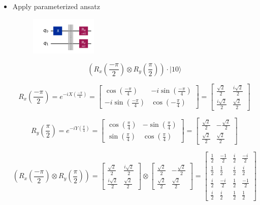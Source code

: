 \documentclass{article}
\begin{document}
\begin{itemize}
	\item Apply parameterized ansatz
	      \begin{figure}[H]
		      \centering
		      \includegraphics[width=0.3\textwidth, height=0.15\textheight]{ansatz1.png}
	      \end{figure}
	      \[
		      \left(R_x(\frac{-\pi}{2}) \otimes R_y(\frac{\pi}{2})\right) \cdot |10 \rangle
	      \]

	      \[
		      R_x(\frac{-\pi}{2}) = e^{-i X (\frac{-\pi}{4})} = \begin{bmatrix}
			      \cos(\frac{-\pi}{4})   & -i\sin(\frac{-\pi}{4}) \\
			      -i\sin(\frac{-\pi}{4}) & \cos(-\frac{\pi}{4})
		      \end{bmatrix}
		      =
		      \begin{bmatrix}
			      \frac{\sqrt{2}}{2}   & \frac{i \sqrt{2}}{2} \\
			      \frac{i \sqrt{2}}{2} & \frac{\sqrt{2}}{2}
		      \end{bmatrix}
	      \]

	      \[
		      R_y(\frac{\pi}{2}) = e^{ -i Y(\frac{\pi}{4})} =
		      \begin{bmatrix}
			      \cos(\frac{\pi}{4}) & -\sin(\frac{\pi}{4}) \\
			      \sin(\frac{\pi}{4}) & \cos(\frac{\pi}{4})
		      \end{bmatrix} =
		      \begin{bmatrix}
			      \frac{\sqrt{2}}{2} & -\frac{\sqrt{2}}{2} \\
			      \frac{\sqrt{2}}{2} & \frac{\sqrt{2}}{2}
		      \end{bmatrix}
	      \]

	      \[
		      \left(R_x(\frac{-\pi}{2}) \otimes R_y(\frac{\pi}{2})\right) =
		      \begin{bmatrix}
			      \frac{\sqrt{2}}{2}   & \frac{i \sqrt{2}}{2} \\
			      \frac{i \sqrt{2}}{2} & \frac{\sqrt{2}}{2}
		      \end{bmatrix}
		      \otimes
		      \begin{bmatrix}
			      \frac{\sqrt{2}}{2} & -\frac{\sqrt{2}}{2} \\
			      \frac{\sqrt{2}}{2} & \frac{\sqrt{2}}{2}
		      \end{bmatrix} =
		      \begin{bmatrix}
			      \frac{1}{2} & \frac{-1}{2} & \frac{i}{2} & \frac{-i}{2} \\
			      \frac{1}{2} & \frac{1}{2}  & \frac{i}{2} & \frac{i}{2}  \\
			      \frac{i}{2} & \frac{-i}{2} & \frac{1}{2} & \frac{-1}{2} \\
			      \frac{i}{2} & \frac{i}{2}  & \frac{1}{2} & \frac{1}{2}
		      \end{bmatrix}
	      \]


\end{itemize}
\end{document}
